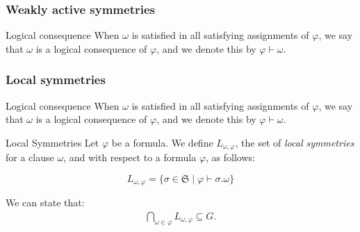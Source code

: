 \documentclass{beamer}
\begin{document}

\begin{frame}
  \scriptsize
  
  
\end{frame}




\begin{frame}[noframenumbering]
\frametitle{Weakly active symmetries}

\begin{block}{Logical consequence}
	When $\omega$ is satisfied in all satisfying assignments of $\varphi$, we say that $\omega$ is a
	logical consequence of $\varphi$, and we denote this by $\varphi \vdash \omega$.
\end{block}


\end{frame}


\begin{frame}[noframenumbering]
\frametitle{Local symmetries}
\newcommand{\symm}[0]{\ensuremath{\mathfrak{S}}}

\begin{block}{Logical consequence}
	When $\omega$ is satisfied in all satisfying assignments of $\varphi$, we say that $\omega$ is a
	logical consequence of $\varphi$, and we denote this by $\varphi \vdash \omega$.
\end{block}

\begin{block}{Local Symmetries}
	Let $\varphi$ be a formula. We define $L_{\omega,\varphi}$,
	the set of \textit{local symmetries} for a clause $\omega$, and with respect to
	a formula $\varphi$, as follows:

	$$L_{\omega,\varphi}=\{\sigma \in \symm \mid \varphi \vdash \sigma.\omega\}$$
\end{block}

 {
	\vfill
	We can state that:
	\begin{align*}
	\underset{\omega \in \varphi}{\bigcap}L_{\omega,\varphi} \subseteq G. %
	\end{align*}
}

\end{frame}
\end{document}

